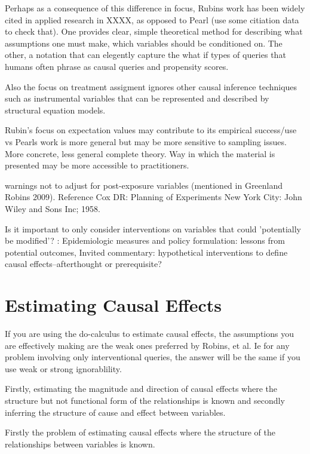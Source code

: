 \documentclass[11pt,a4paper]{article}
\begin{document}
Perhaps as a consequence of this difference in focus, Rubins work has been widely cited in applied research in XXXX, as opposed to Pearl (use some citiation data to check that). One provides clear, simple theoretical method for describing what assumptions one must make, which variables should be conditioned on. The other, a notation that can elegently capture the what if types of queries that humans often phrase as causal queries and propensity scores.

Also the focus on treatment assigment ignores other causal inference techniques such as instrumental variables that can be represented and described by structural equation models. 

Rubin's focus on expectation values may contribute to its empirical success/use vs Pearls work is more general but may be more sensitive to sampling issues. More concrete, less general complete theory. Way in which the material is presented may be more accessible to practitioners. 

warnings not to adjust for post-exposure variables (mentioned in Greenland  Robins 2009). Reference Cox DR: Planning of Experiments New York City: John Wiley and Sons
Inc; 1958.

Is it important to only consider interventions on variables that could 'potentially be modified'? : Epidemiologic measures and policy formulation:
lessons from potential outcomes,
Invited commentary: hypothetical interventions
to define causal effects--afterthought or prerequisite?



\section*{Estimating Causal Effects}

If you are using the do-calculus to estimate causal effects, the assumptions you are effectively making are the weak ones preferred by Robins, et al. Ie for any problem involving only interventional queries, the answer will be the same if you use weak or strong ignorablility. 

Firstly, estimating the magnitude and direction of causal effects where the structure but not functional form of the relationships is known and secondly inferring the structure of cause and effect between variables. 

Firstly the problem of estimating causal effects where the structure of the relationships between variables is known. 
\end{document}
